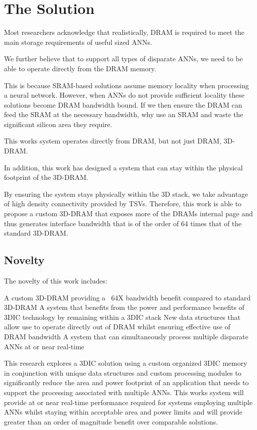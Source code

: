 \section[The Solution]{The Solution}
\label{sec:The Solution}

Most researchers acknowledge that realistically, DRAM is required to meet the main storage requirements of useful sized ANNs.

We further believe that to support all types of disparate ANNs, we need to be able to operate directly from the DRAM memory.

This is because SRAM-based solutions assume memory locality when processing a neural network. However, when ANNs do not provide sufficient locality these solutions become DRAM bandwidth bound. If we then ensure the DRAM can feed the SRAM at the necessary bandwidth, why use an SRAM and waste the significant silicon area they require.

This works system operates directly from DRAM, but not just DRAM, 3D-DRAM.

In addition, this work has designed a system that can stay within the physical footprint of the 3D-DRAM.

By ensuring the system stays physically within the 3D stack, we take advantage of high density connectivity provided by TSVs. 
Therefore, this work is able to propose a custom 3D-DRAM that exposes more of the DRAMs internal page and thus generates interface bandwidth that is of the order of 64 times that of the standard 3D-DRAM.

\subsection[Novelty]{Novelty}
\label{sec:Novelty}

The novelty of this work includes:
\begin{outline}
    \1 A custom 3D-DRAM providing a ~64X bandwidth benefit compared to standard 3D-DRAM
    \1 A system that benefits from the power and performance benefits of 3DIC technology by remaining within a 3DIC stack
    \1 New data structures that allow use to operate directly out of DRAM whilst ensuring effective use of DRAM bandwidth
    \1 A system that can simultaneously process multiple disparate ANNs at or near real-time
\end{outline}


This research explores a 3DIC solution using a custom organized 3DIC memory in conjunction with unique data structures and custom processing modules to significantly reduce the 
area and power footprint of an application that needs to support the processing associated with multiple ANNs.
This works system will provide at or near real-time performance required for systems employing multiple ANNs whilst staying within acceptable area and power limits and will provide greater than an order of magnitude benefit over comparable solutions.



